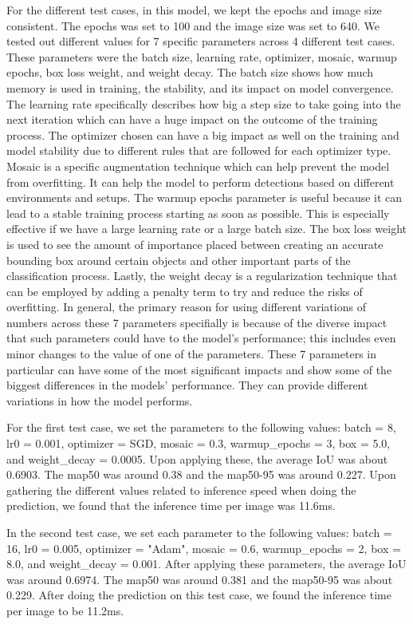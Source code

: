 \documentclass[stu,12pt,floatsintext]{apa7}
\begin{document}
For the different test cases, in this model, we kept the epochs and image size consistent. The epochs was set to 100 and the image size was set to 640. We tested out different values for 7 specific parameters across 4 different test cases. These parameters were the batch size, learning rate, optimizer, mosaic, warmup epochs, box loss weight, and weight decay. The batch size shows how much memory is used in training, the stability, and its impact on model convergence. The learning rate specifically describes how big a step size to take going into the next iteration which can have a huge impact on the outcome of the training process. The optimizer chosen can have a big impact as well on the training and model stability due to different rules that are followed for each optimizer type. Mosaic is a specific augmentation technique which can help prevent the model from overfitting. It can help the model to perform detections based on different environments and setups. The warmup epochs parameter is useful because it can lead to a stable training process starting as soon as possible. This is especially effective if we have a large learning rate or a large batch size. The box loss weight is used to see the amount of importance placed between creating an accurate bounding box around certain objects and other important parts of the classification process. Lastly, the weight decay is a regularization technique that can be employed by adding a penalty term to try and reduce the risks of overfitting. In general, the primary reason for using different variations of numbers across these 7 parameters specifially is  because of the diverse impact that such parameters could have to the model's performance; this includes even minor changes to the value of one of the parameters. These 7 parameters in particular can have some of the most significant impacts and show some of the biggest differences in the models' performance. They can provide different variations in how the model performs. 

For the first test case, we set the parameters to the following values: batch = 8, lr0 = 0.001, optimizer = SGD, mosaic = 0.3, warmup\_epochs = 3, box = 5.0, and weight\_decay = 0.0005. Upon applying these, the average IoU was about 0.6903. The map50 was around 0.38 and the map50-95 was around 0.227. Upon gathering the different values related to inference speed when doing the prediction, we found that the inference time per image was 11.6ms. 

In the second test case, we set each parameter to the following values: batch = 16, lr0 = 0.005, optimizer = "Adam", mosaic = 0.6, warmup\_epochs = 2, box = 8.0, and weight\_decay = 0.001. After applying these parameters, the average IoU was around 0.6974. The map50 was around 0.381 and the map50-95 was about 0.229. After doing the prediction on this test case, we found the inference time per image to be 11.2ms. 
\end{document}
